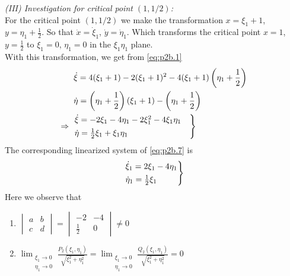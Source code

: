 \documentclass[../main-sheet.tex]{subfiles}
\begin{document}
\begin{soln}[b]
    
    \emph{(III) Investigation for critical point \((1,1/2)\):}\\
    For the critical point \((1,1/2)\) we make the transformation \(x=\xi_1+1\), \(y=\eta_1+\frac{1}{2}\). So that \(\dot{x}=\dot{\xi}_1\), \(\dot{y}=\dot{\eta}_1\). Which transforms the critical point \(x=1\), \(y=\frac{1}{2}\) to \(\xi_1=0\), \(\eta_1=0\) in the \(\xi_1\eta_1\) plane.\\
    With this transformation, we get from \eqref{eq:p2b.1}
    \begin{align}
        &\dot{\xi}=4(\xi_1+1)-2(\xi_1+1)^2-4(\xi_1+1)\left(\eta_1+\frac{1}{2}\right)\notag\\
        &\dot{\eta}=\left( \eta_1+\frac{1}{2} \right)(\xi_1+1)-\left( \eta_1+\frac{1}{2} \right)\notag\\
        \Rightarrow\;\;&\begin{aligned}
            \begin{rcases}
                \dot{\xi}=-2\xi_1-4\eta_1-2\xi_1^2-4\xi_1\eta_1\quad\\
                \dot{\eta}=\frac{1}{2}\xi_1+\xi_1\eta_1
            \end{rcases}
        \end{aligned}\label{eq:p2b.7}
    \end{align}
    The corresponding linearized system of \eqref{eq:p2b.7} is 
    \begin{equation}
        \begin{rcases}
            \dot{\xi}_1=2\xi_1-4\eta_1\\
            \dot{\eta}_1=\frac{1}{2}\xi_1\quad
        \end{rcases}
        \label{eq:p2b.8}
    \end{equation}
    Here we observe that
    \begin{enumerate}[label=(\roman*)]
        \item \(\begin{vmatrix}
            a&b\\
            c&d
        \end{vmatrix}=\begin{vmatrix}
            -2&-4\\
            \frac{1}{2}&0
        \end{vmatrix}\neq 0\)
        \item \(\displaystyle\lim_{\substack{\xi_1\to 0 \\ \eta_1\to 0}} \frac{P_2(\xi_1,\eta_1)}{\sqrt{\xi_1^2+\eta_1^2}}=\lim_{\substack{\xi_1\to 0 \\ \eta_1\to 0}} \frac{Q_2(\xi_1,\eta_1)}{\sqrt{\xi_1^2+\eta_1^2}}=0\)\\ 
        

\end{enumerate}
\end{soln}
\end{document}
